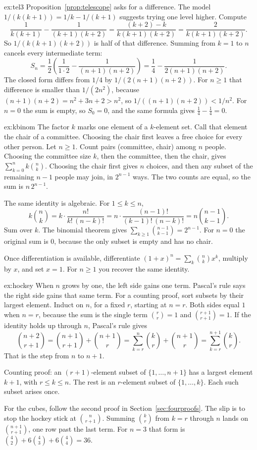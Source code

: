 \begin{solution}{ex:tel3}
\idea Proposition~\ref{prop:telescope} asks for a difference. The model $1/(k(k+1))=1/k-1/(k+1)$ suggests trying one level higher.
\writeup Compute
\[
\frac1{k(k+1)}-\frac1{(k+1)(k+2)}=\frac{(k+2)-k}{k(k+1)(k+2)}=\frac{2}{k(k+1)(k+2)}.
\]
So $1/(k(k+1)(k+2))$ is half of that difference. Summing from $k=1$ to $n$ cancels every intermediate term:
\[
S_n=\frac12\left(\frac1{1\cdot2}-\frac1{(n+1)(n+2)}\right)=\frac14-\frac1{2(n+1)(n+2)}.
\]
The closed form differs from $1/4$ by $1/(2(n+1)(n+2))$. For $n\ge1$ that difference is smaller than $1/(2n^2)$, because $(n+1)(n+2)=n^2+3n+2>n^2$, so $1/((n+1)(n+2))<1/n^2$. For $n=0$ the sum is empty, so $S_0=0$, and the same formula gives $\frac14-\frac14=0$.
\end{solution}

\begin{solution}{ex:kbinom}
\idea The factor $k$ marks one element of a $k$-element set. Call that element the chair of a committee. Choosing the chair first leaves a free choice for every other person.
\writeup Let $n\ge1$. Count pairs (committee, chair) among $n$ people. Choosing the committee size $k$, then the committee, then the chair, gives $\sum_{k=0}^n k\binom nk$. Choosing the chair first gives $n$ choices, and then any subset of the remaining $n-1$ people may join, in $2^{n-1}$ ways. The two counts are equal, so the sum is $n\,2^{n-1}$.

The same identity is algebraic. For $1\le k\le n$,
\[
k\binom nk=k\cdot\frac{n!}{k!\,(n-k)!}=n\cdot\frac{(n-1)!}{(k-1)!\,(n-k)!}=n\binom{n-1}{k-1}.
\]
Sum over $k$. The binomial theorem gives $\sum_{k\ge1}\binom{n-1}{k-1}=2^{n-1}$. For $n=0$ the original sum is $0$, because the only subset is empty and has no chair.

Once differentiation is available, differentiate $(1+x)^n=\sum_k\binom nk x^k$, multiply by $x$, and set $x=1$. For $n\ge1$ you recover the same identity.
\end{solution}

\begin{solution}{ex:hockey}
\idea When $n$ grows by one, the left side gains one term. Pascal's rule says the right side gains that same term. For a counting proof, sort subsets by their largest element.
\writeup Induct on $n$, for a fixed $r$, starting at $n=r$. Both sides equal $1$ when $n=r$, because the sum is the single term $\binom rr=1$ and $\binom{r+1}{r+1}=1$. If the identity holds up through $n$, Pascal's rule gives
\[
\binom{n+2}{r+1}=\binom{n+1}{r+1}+\binom{n+1}{r}=\sum_{k=r}^n\binom kr+\binom{n+1}{r}=\sum_{k=r}^{n+1}\binom kr.
\]
That is the step from $n$ to $n+1$.

Counting proof: an $(r+1)$-element subset of $\{1,\dots,n+1\}$ has a largest element $k+1$, with $r\le k\le n$. The rest is an $r$-element subset of $\{1,\dots,k\}$. Each such subset arises once.

For the cubes, follow the second proof in Section~\ref{sec:fourproofs}. The slip is to stop the hockey stick at $\binom n{r+1}$. Summing $\binom kr$ from $k=r$ through $n$ lands on $\binom{n+1}{r+1}$, one row past the last term. For $n=3$ that form is $\binom42+6\binom43+6\binom44=36$.
\end{solution}

